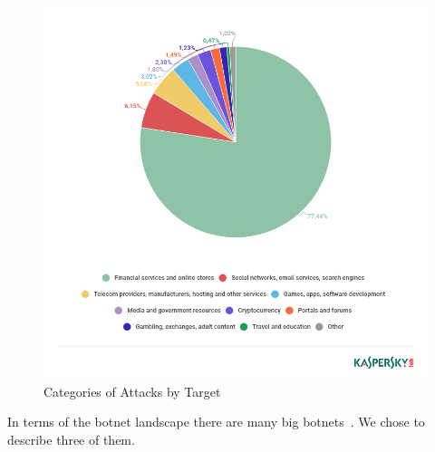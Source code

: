 \begin{figure}[ht]
\begin{center} \includegraphics[scale=0.5]{Talk11/kasperskyAttacks} \end{center}
\caption{Categories of Attacks by Target~\cite{Eremin19}}
\label{fig:KasperskyAttacks}
\end{figure}

In terms of the botnet landscape there are many big botnets~\cite{CenturyLink19}.
We chose to describe three of them.

